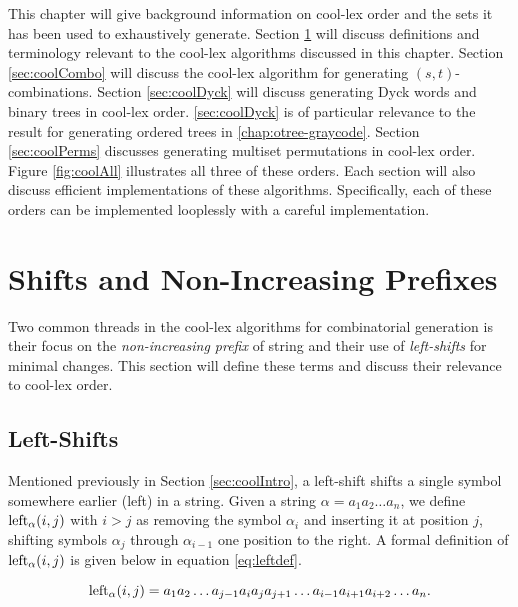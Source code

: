 This chapter will give background information on cool-lex order and the sets it has been used to exhaustively generate.  Section \ref{sec:shiftsandprefixes} will discuss definitions and terminology relevant to the cool-lex algorithms discussed in this chapter.  Section \ref{sec:coolCombo} will discuss the cool-lex algorithm for generating $(s,t)$-combinations.  Section \ref{sec:coolDyck} will discuss generating Dyck words and binary trees in cool-lex order.  \ref{sec:coolDyck} is of particular relevance to the result for generating ordered trees in \ref{chap:otree-graycode}.  Section \ref{sec:coolPerms} discusses generating multiset permutations in cool-lex order.  Figure \ref{fig:coolAll} illustrates all three of these orders. Each section will also discuss efficient implementations of these algorithms.  Specifically, each of these orders can be implemented looplessly with a careful implementation.


\section{Shifts and Non-Increasing Prefixes} \label{sec:shiftsandprefixes}
Two common threads in the cool-lex algorithms for combinatorial generation is their focus on the \emph{non-increasing prefix} of string and their use of \emph{left-shifts} for minimal changes.  This section will define these terms and discuss their relevance to cool-lex order.

\subsection{Left-Shifts}
  Mentioned previously in Section \ref{sec:coolIntro}, a left-shift shifts a single symbol somewhere earlier (left) in a string.  Given a string $\alpha = a_1 a_2 \ldots a_n$, we define $\lshiftindex[\alpha]{i}{j}$ with $i > j$ as removing the symbol $\alpha_i$ and inserting it at position $j$, shifting symbols $\alpha_j$ through $\alpha_{i-1}$ one position to the right.  A formal definition of $\lshiftindex[\alpha]{i}{j}$ is given below in equation \eqref{eq:leftdef}.

\begin{equation} \label{eq:leftdef}
    \lshiftindex[\alpha]{i}{j} = a_1 a_2 \ldots a_{j-1} a_i a_{j} a_{j+1} \ldots a_{i-1} a_{i+1} a_{i+2} \ldots a_n.
\end{equation}


